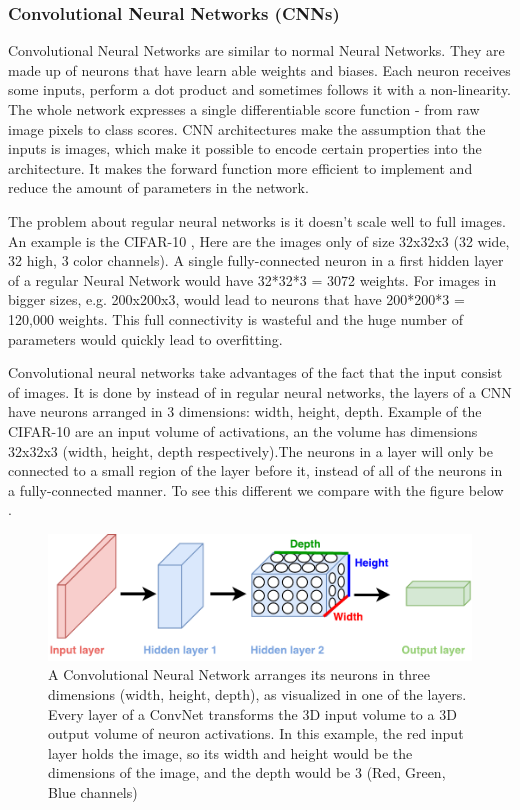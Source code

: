 \subsubsection*{Convolutional Neural Networks (CNNs)}

Convolutional Neural Networks are similar to normal Neural Networks. They are made up of neurons that have learn able weights and biases. Each neuron receives some inputs, perform a dot product and sometimes follows it with a non-linearity. The whole network expresses a single differentiable score function - from raw image pixels to class scores. CNN architectures make the assumption that the inputs is images, which make it possible to encode certain properties into the architecture. It makes the forward function more efficient to implement and reduce the amount of parameters in the network. \cite{CNN_course}      

The problem about regular neural networks is it doesn't scale well to full images. An example is the CIFAR-10 \cite{CIFAR_10}, Here are the images only of size 32x32x3 (32 wide, 32 high, 3 color channels). A single fully-connected neuron in a first hidden layer of a regular Neural Network would have 32*32*3 = 3072 weights. For images in bigger sizes, e.g. 200x200x3, would lead to neurons that have 200*200*3 = 120,000 weights. This full connectivity is wasteful and the huge number of parameters would quickly lead to overfitting.

Convolutional neural networks take advantages of the fact that the input consist of images. It is done by instead of in regular neural networks, the layers of a CNN have neurons arranged in 3 dimensions: width, height, depth. Example of the CIFAR-10 are an input volume of activations, an the volume has dimensions 32x32x3 (width, height, depth respectively).The neurons in a layer will only be connected to a small region of the layer before it, instead of all of the neurons in a fully-connected manner. To see this different we compare  with the figure below .  

\begin{figure}[H]
	\centering
	\includegraphics[width=1\textwidth]{Figures/NN_vs_CNN.pdf}
	\caption{A Convolutional Neural Network arranges its neurons in three dimensions (width, height, depth), as visualized in one of the layers. Every layer of a ConvNet transforms the 3D input volume to a 3D output volume of neuron activations. In this example, the red input layer holds the image, so its width and height would be the dimensions of the image, and the depth would be 3 (Red, Green, Blue channels) \cite{CNN_course}}
	\label{fig:NN_vs_CNN}
\end{figure}

